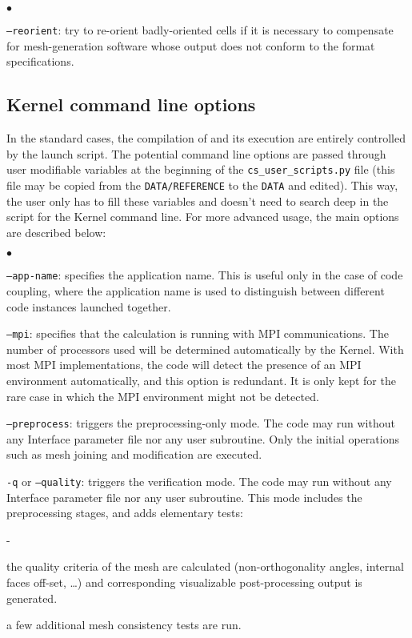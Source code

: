 {{{\begin{list}{$\bullet$}{}
\item \texttt{--reorient}: try to re-orient badly-oriented cells
if it is necessary to compensate for mesh-generation software
whose output does not conform to the format specifications.

\end{list}

\subsection{Kernel command line options}
\label{sec:prg_optappelnoy}%
In the standard cases, the compilation of \CS and its execution are entirely
controlled by the launch script. The potential command line options are passed
through user modifiable variables at the beginning of the \texttt{cs\_user\_scripts.py} file
(this file may be copied from the \texttt{DATA/REFERENCE} to the \texttt{DATA} and edited).
This way, the user only has to fill these variables and doesn't need
to search deep in the script for the Kernel command line. For more advanced
usage, the main options are described below:

\begin{list}{$\bullet$}{}
\item \texttt{--app-name}: specifies the application name. This is
useful only in the case of code coupling, where the application name
is used to distinguish between different code instances launched together.

\item \texttt{--mpi}: specifies that the calculation is running
with MPI communications. The number of processors used will be determined
automatically by the Kernel. With most MPI implementations, the
code will detect the presence of an MPI environment automatically, and
this option is redundant. It is only kept for the rare case in which the
MPI environment might not be detected.

\item \texttt{--preprocess}: triggers the preprocessing-only mode.
The code may run without any Interface parameter file nor any user subroutine.
Only the initial operations such as mesh joining and modification are
executed.

\item \texttt{-q} or \texttt{--quality}: triggers the verification mode.
The code may run without any Interface parameter file nor any user subroutine.
This mode includes the preprocessing stages, and adds elementary tests:\\
\begin{list}{-}{}
\item the quality criteria of the mesh are calculated (non-orthogonality angles,
internal faces off-set, \ldots) and corresponding
visualizable post-processing output is generated.\\
\item a few additional mesh consistency tests are run.\\
\end{list}


\end{list}}}}
